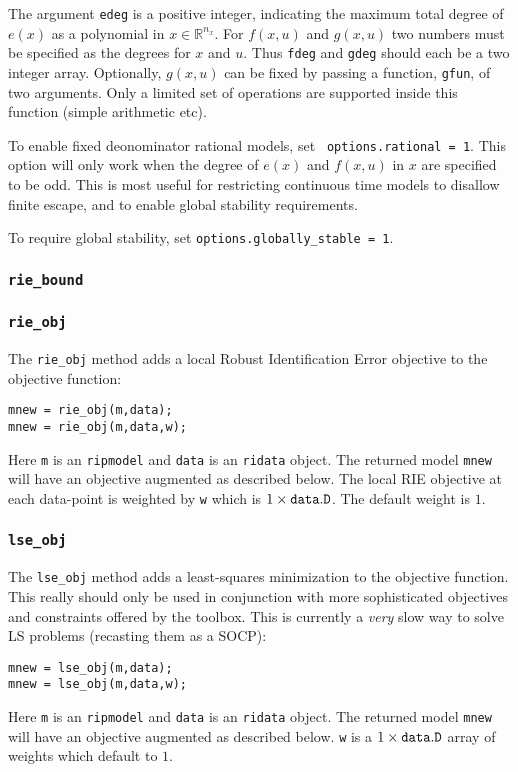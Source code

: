 \documentclass{article}
\newcommand{\RR}{\mathbb{R}}
\begin{document}
The argument {\tt edeg} is a positive integer, indicating the maximum
total degree of $e(x)$ as a polynomial in $x \in \RR^{n_x}$.  For
$f(x,u)$ and $g(x,u)$ two numbers must be specified as the degrees for
$x$ and $u$.  Thus {\tt fdeg} and {\tt gdeg} should each be a two
integer array.  Optionally, $g(x,u)$ can be fixed by passing a
function, {\tt gfun}, of two arguments.  Only a limited set of
operations are supported inside this function (simple arithmetic etc).

To enable fixed deonominator rational models, set {\tt
  options.rational = 1}.  This option will only work when
the degree of $e(x)$ and $f(x,u)$ in $x$ are specified to be odd.
This is most useful for restricting continuous time models to disallow
finite escape, and to enable global stability requirements.

To require global stability, set {\tt options.globally\_stable = 1}.

\subsubsection{{\tt rie\_bound}}
\subsubsection{{\tt rie\_obj}}
The {\tt rie\_obj} method adds a local Robust Identification Error objective to the
objective function:
\begin{verbatim}
mnew = rie_obj(m,data);
mnew = rie_obj(m,data,w);
\end{verbatim}
Here {\tt m} is an {\tt ripmodel} and {\tt data} is an {\tt ridata}
object.  The returned model {\tt mnew} will have an objective
augmented as described below. 
The local RIE objective at each data-point is  weighted by {\tt w} which is  $1 \times {\tt
  data.D}$.  The default weight is $1$.
\subsubsection{{\tt lse\_obj}}
The {\tt lse\_obj} method adds a least-squares minimization to the
objective function.  This really should only be used in conjunction
with more sophisticated objectives and constraints offered by the
toolbox.  This is currently a {\it very} slow way to solve LS problems
(recasting them as a SOCP):
\begin{verbatim}
mnew = lse_obj(m,data);
mnew = lse_obj(m,data,w);
\end{verbatim}
Here {\tt m} is an {\tt ripmodel} and {\tt data} is an {\tt ridata}
object.  The returned model {\tt mnew} will have an objective
augmented as described below.  {\tt w} is a $1 \times {\tt data.D}$
array of weights which default to $1$.
\end{document}

